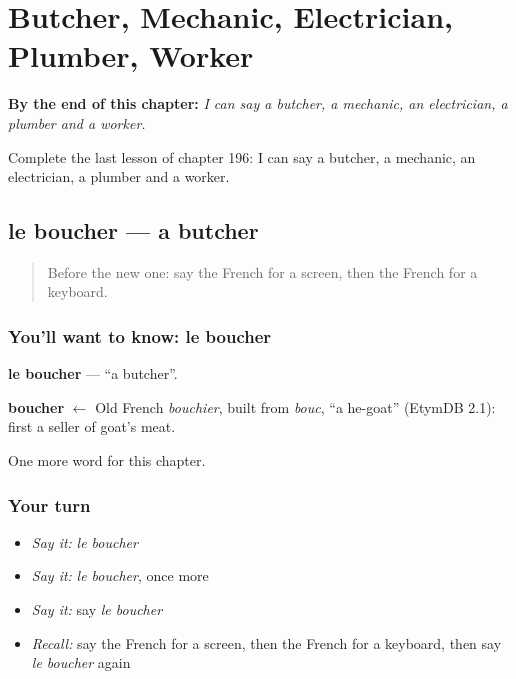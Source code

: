 
\chapter{Butcher, Mechanic, Electrician, Plumber, Worker}
\label{ch:fr-butcher-mechanic-electrician-plumber-worker}

\begin{chapteropening}
\textbf{By the end of this chapter:} \emph{I can say a butcher, a mechanic, an electrician, a plumber and a worker.}

Complete the last lesson of chapter 196: I can say a butcher, a mechanic, an electrician, a plumber and a worker.
\end{chapteropening}

\section[le boucher]{le boucher — a butcher}

\label{lesson:FR-C196-boucher}



\begin{quote}
Before the new one: say the French for a screen, then the French for a keyboard.
\end{quote}

\subsection*{You'll want to know: le boucher}
\textbf{le boucher} — \textquotedblleft{}a butcher\textquotedblright{}.

\begin{cousinweb}
\textbf{boucher} $\leftarrow$ Old French \emph{bouchier}, built from \emph{bouc}, \textquotedblleft{}a he-goat\textquotedblright{} (EtymDB 2.1): first a seller of goat's meat.
\end{cousinweb}

\begin{grammarlens}[title={What you've built}]
One more word for this chapter.
\end{grammarlens}

\subsection*{Your turn}
\begin{itemize}
\raggedright
  \item \emph{Say it:} \emph{le boucher}
  \item \emph{Say it:} \emph{le boucher}, once more
  \item \emph{Say it:} say \emph{le boucher}
  \item \emph{Recall:} say the French for a screen, then the French for a keyboard, then say \emph{le boucher} again
\end{itemize}

